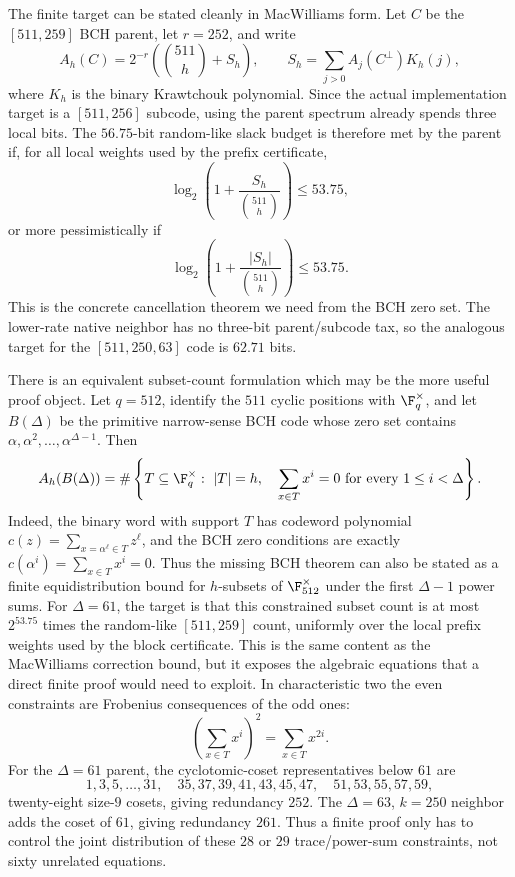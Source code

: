 The finite target can be stated cleanly in MacWilliams form.  Let \(C\) be the \([511,259]\) BCH parent, let
\(r=252\), and write
\[
A_h(C)=2^{-r}\left(\binom{511}{h}+S_h\right),
\qquad
S_h=\sum_{j>0} A_j(C^\perp)K_h(j),
\]
where \(K_h\) is the binary Krawtchouk polynomial.  Since the actual implementation target is a
\([511,256]\) subcode, using the parent spectrum already spends three local bits.  The \(56.75\)-bit random-like slack
budget is therefore met by the parent if, for all local weights used by the prefix certificate,
\[
\log_2\left(1+\frac{S_h}{\binom{511}{h}}\right)\le 53.75,
\]
or more pessimistically if
\[
\log_2\left(1+\frac{|S_h|}{\binom{511}{h}}\right)\le 53.75.
\]
This is the concrete cancellation theorem we need from the BCH zero set.  The lower-rate native neighbor has no
three-bit parent/subcode tax, so the analogous target for the \([511,250,63]\) code is \(62.71\) bits.

There is an equivalent subset-count formulation which may be the more useful proof object.  Let \(q=512\), identify the
\(511\) cyclic positions with \(\F_q^\times\), and let \(B(\Delta)\) be the primitive narrow-sense BCH code whose zero
set contains \(\alpha,\alpha^2,\ldots,\alpha^{\Delta-1}\).  Then
\[
A_h(B(\Delta))
=
\#\left\{
T\subseteq \F_q^\times:\ |T|=h,\quad
\sum_{x\in T}x^i=0\ \text{for every }1\le i<\Delta
\right\}.
\]
Indeed, the binary word with support \(T\) has codeword polynomial \(c(z)=\sum_{x=\alpha^\ell\in T}z^\ell\), and the
BCH zero conditions are exactly \(c(\alpha^i)=\sum_{x\in T}x^i=0\).  Thus the missing BCH theorem can also be stated as
a finite equidistribution bound for \(h\)-subsets of \(\F_{512}^\times\) under the first \(\Delta-1\) power sums.  For
\(\Delta=61\), the target is that this constrained subset count is at most \(2^{53.75}\) times the random-like
\([511,259]\) count, uniformly over the local prefix weights used by the block certificate.  This is the same content
as the MacWilliams correction bound, but it exposes the algebraic equations that a direct finite proof would need to
exploit.
In characteristic two the even constraints are Frobenius consequences of the odd ones:
\[
\left(\sum_{x\in T}x^i\right)^2=\sum_{x\in T}x^{2i}.
\]
For the \(\Delta=61\) parent, the cyclotomic-coset representatives below \(61\) are
\[
1,3,5,\ldots,31,\quad 35,37,39,41,43,45,47,\quad 51,53,55,57,59,
\]
twenty-eight size-\(9\) cosets, giving redundancy \(252\).  The \(\Delta=63\), \(k=250\) neighbor adds the coset of
\(61\), giving redundancy \(261\).  Thus a finite proof only has to control the joint distribution of these
\(28\) or \(29\) trace/power-sum constraints, not sixty unrelated equations.

